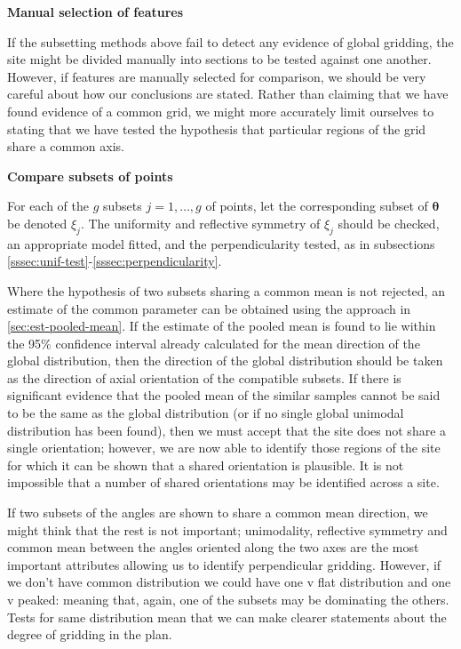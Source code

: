 \documentclass[../../ArchStats.tex]{subfiles}
\begin{document}

\textbf{Manual selection of features}

 If the subsetting methods above fail to detect any evidence of global gridding, the site might be divided manually into sections to be tested against one another. However, if features are manually selected for comparison, we should be very careful about how our conclusions are stated. Rather than claiming that we have found evidence of a common grid, we might more accurately limit ourselves to stating that we have tested the hypothesis that particular regions of the grid share a common axis.

\textbf{Compare subsets of points}

For each of the $g$ subsets $j = 1, \dots, g$ of points, let the corresponding subset of $\boldsymbol{\theta}$ be denoted $\xi_j$. The uniformity and reflective symmetry of  $\xi_j$ should be checked, an appropriate model fitted, and the perpendicularity tested, as in subsections \ref{sssec:unif-test}-\ref{sssec:perpendicularity}. 



Where the hypothesis of two subsets sharing a common mean is not rejected, an estimate of the common parameter can be obtained using the approach in \ref{sec:est-pooled-mean}. If the estimate of the pooled mean is found to lie within the 95\% confidence interval already calculated for the mean direction of the global distribution, then the direction of the global distribution should be taken as the direction of axial orientation of the compatible subsets. If there is significant evidence that the pooled mean of the similar samples cannot be said to be the same as the global distribution (or if no single global unimodal distribution has been found), then we must accept that the site does not share a single orientation; however, we are now able to identify those regions of the site for which it can be shown that a shared orientation is plausible. It is not impossible that a  number of shared orientations may be identified across a site.

If two subsets of the angles are shown to share a common mean direction, we might think that the rest is not important; unimodality, reflective symmetry and common mean between the angles oriented along the two axes are the most important attributes allowing us to identify perpendicular gridding. However, if we don't have common distribution we could have one v flat distribution and one v peaked: meaning that, again, one of the subsets may be dominating the others. Tests for same distribution mean that we can make clearer statements about the degree of gridding in the plan.
\end{document}
